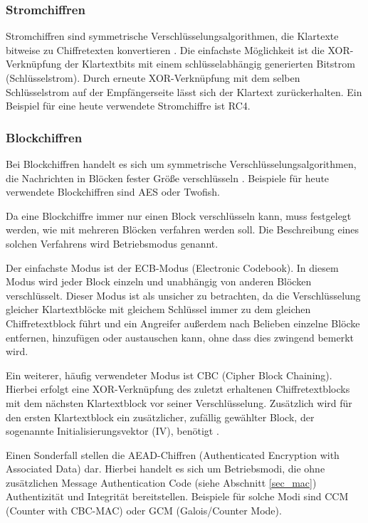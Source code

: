 \subsubsection{Stromchiffren}

Stromchiffren sind symmetrische Verschlüsselungsalgorithmen, die Klartexte bitweise zu Chiffretexten konvertieren \cite{Schneier2006}. Die einfachste Möglichkeit ist die XOR-Verknüpfung der Klartextbits mit einem schlüsselabhängig generierten Bitstrom (Schlüsselstrom). Durch erneute XOR-Verknüpfung mit dem selben Schlüsselstrom auf der Empfängerseite lässt sich der Klartext zurückerhalten. Ein Beispiel für eine heute verwendete Stromchiffre ist RC4.

\subsubsection{Blockchiffren}

\label{sec_block_cipher}

Bei Blockchiffren handelt es sich um symmetrische Verschlüsselungsalgorithmen, die Nachrichten in Blöcken fester Größe verschlüsseln \cite{Schneier2006}. Beispiele für heute verwendete Blockchiffren sind AES oder Twofish.

Da eine Blockchiffre immer nur einen Block verschlüsseln kann, muss festgelegt werden, wie mit mehreren Blöcken verfahren werden soll. Die Beschreibung eines solchen Verfahrens wird Betriebsmodus genannt.

Der einfachste Modus ist der ECB-Modus (Electronic Codebook). In diesem Modus wird jeder Block einzeln und unabhängig von anderen Blöcken verschlüsselt. Dieser Modus ist als unsicher zu betrachten, da die Verschlüsselung gleicher Klartextblöcke mit gleichem Schlüssel immer zu dem gleichen Chiffretextblock führt und ein Angreifer außerdem nach Belieben einzelne Blöcke entfernen, hinzufügen oder austauschen kann, ohne dass dies zwingend bemerkt wird.

Ein weiterer, häufig verwendeter Modus ist CBC (Cipher Block Chaining). Hierbei erfolgt eine XOR-Verknüpfung des zuletzt erhaltenen Chiffretextblocks mit dem nächsten Klartextblock vor seiner Verschlüsselung. Zusätzlich wird für den ersten Klartextblock ein zusätzlicher, zufällig gewählter Block, der sogenannte Initialisierungsvektor (IV), benötigt \cite{Schneier2006}.

Einen Sonderfall stellen die AEAD-Chiffren (Authenticated Encryption with Associated Data) dar. Hierbei handelt es sich um Betriebsmodi, die ohne zusätzlichen Message Authentication Code (siehe Abschnitt \ref{sec_mac}) Authentizität und Integrität bereitstellen. Beispiele für solche Modi sind CCM (Counter with CBC-MAC) oder GCM (Galois/Counter Mode). 

